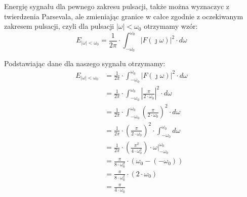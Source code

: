 \begin{task}
Energię sygnału dla pewnego zakresu pulsacji, także można wyznaczyc z twierdzenia Parsevala, ale zmieniając granice w całce zgodnie z oczekiwanym zakresem pulsacji, czyli dla pulsacji $\left| \omega \right| < \omega_0$ otrzymamy wzór:
\begin{equation}
 E_{\left| \omega \right| < \omega_0} = \frac{1}{2\pi} \cdot \int_{-\omega_0}^{\omega_0} \left|F(\jmath \omega)\right|^2 \cdot d\omega
\end{equation}

Podstawiając dane dla naszego sygnału otrzymamy:
\begin{align*}
E_{\left| \omega \right| < \omega_0} &= \frac{1}{2\pi} \cdot \int_{-\omega_0}^{\omega_0} \left|F(\jmath \omega)\right|^2 \cdot d\omega\\
&= \frac{1}{2\pi} \cdot \int_{-\omega_0}^{\omega_0} \left|\frac{\pi}{2 \cdot \omega_0}\right|^2 \cdot d\omega\\
&= \frac{1}{2\pi} \cdot \int_{-\omega_0}^{\omega_0} \left(\frac{\pi}{2 \cdot \omega_0}\right)^2 \cdot d\omega\\
&= \frac{1}{2\pi} \cdot \left(\frac{\pi}{2 \cdot \omega_0}\right)^2 \cdot \int_{-\omega_0}^{\omega_0} d\omega\\
&= \frac{1}{2\pi} \cdot \left(\frac{\pi^2}{4 \cdot \omega_0^2}\right) \cdot \left.\omega\right|_{-\omega_0}^{\omega_0}\\
&= \frac{\pi}{8 \cdot \omega_0^2} \cdot (\omega_0 - (-\omega_0))\\
&= \frac{\pi}{8 \cdot \omega_0^2} \cdot (2 \cdot \omega_0)\\
&= \frac{\pi}{4 \cdot \omega_0}\\
\end{align*}



\end{task}

